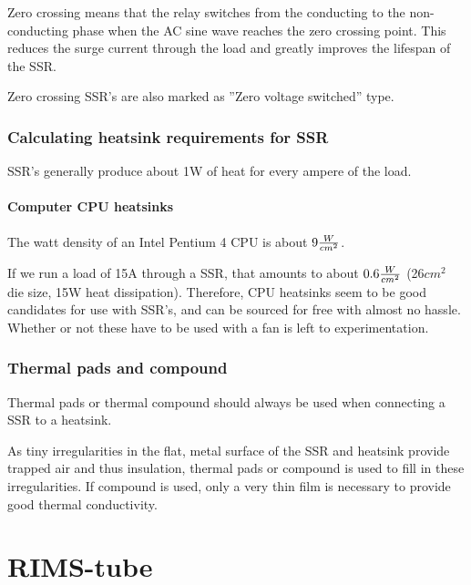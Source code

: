 \documentclass[11pt,fleqn,openany]{book} %
\begin{document}
Zero crossing means that the relay switches from the conducting to the non-conducting phase when the AC sine wave reaches the zero crossing point. This reduces the surge current through the load and greatly improves the lifespan of the SSR.

Zero crossing SSR's are also marked as ''Zero voltage switched'' type.

\subsection{Calculating heatsink requirements for SSR}

SSR's generally produce about 1W of heat for every ampere of the load.

\subsubsection{Computer CPU heatsinks}

The watt density of an Intel Pentium 4 CPU is about $9 {W \over {cm^2}}$.

If we run a load of 15A through a SSR, that amounts to about $0.6 {W \over {cm^2}}$ (26$cm^2$ die size, 15W heat dissipation). Therefore, CPU heatsinks seem to be good candidates for use with SSR's, and can be sourced for free with almost no hassle. Whether or not these have to be used with a fan is left to experimentation.

\subsection{Thermal pads and compound}

Thermal pads or thermal compound should always be used when connecting a SSR to a heatsink.

As tiny irregularities in the flat, metal surface of the SSR and heatsink provide trapped air and thus insulation, thermal pads or compound is used to fill in these irregularities. If compound is used, only a very thin film is necessary to provide good thermal conductivity.



\chapter{RIMS-tube}
\end{document}
